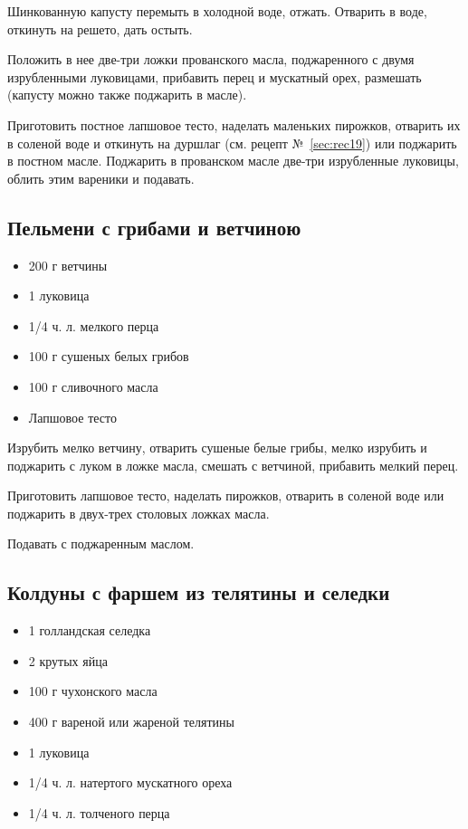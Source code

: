 Шинкованную капусту перемыть в холодной воде, отжать. Отварить в воде, откинуть на решето, дать остыть.

Положить в нее две-три ложки прованского масла, поджаренного с двумя изрубленными луковицами, прибавить перец и мускатный орех, размешать (капусту можно также поджарить в масле).

Приготовить постное лапшовое тесто, наделать маленьких пирожков, отварить их в соленой воде и откинуть на дуршлаг (см. рецепт №~\ref{sec:rec19}) или поджарить в постном масле. Поджарить в прованском масле две-три изрубленные луковицы, облить этим вареники и подавать.

\subsection{Пельмени с грибами и ветчиною}

\begin{itemize}
	\item 200 г ветчины
    \item 1 луковица 
    \item 1/4 ч. л. мелкого перца
    \item 100 г сушеных белых грибов 
    \item 100 г сливочного масла 
    \item Лапшовое тесто
\end{itemize}

Изрубить мелко ветчину, отварить сушеные белые грибы, мелко изрубить и поджарить с луком в ложке масла, смешать с ветчиной, прибавить мелкий перец.

Приготовить лапшовое тесто, наделать пирожков, отварить в соленой воде или поджарить в двух-трех столовых ложках масла.

Подавать с поджаренным маслом.

\subsection{Колдуны с фаршем из телятины и селедки}

\begin{itemize}
	\item 1 голландская селедка 
    \item 2 крутых яйца 
    \item 100 г чухонского масла
    \item 400 г вареной или жареной телятины 
    \item 1 луковица 
    \item 1/4 ч. л. натертого мускатного ореха
    \item 1/4 ч. л. толченого перца
\end{itemize}

